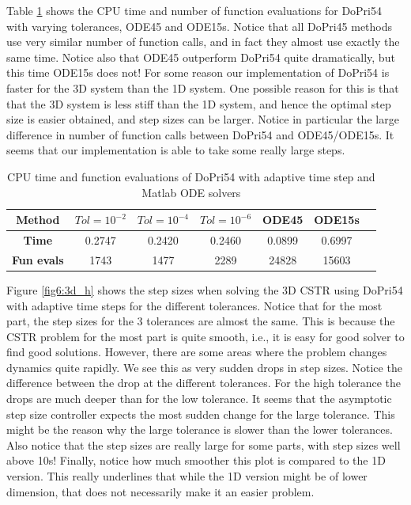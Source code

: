 Table \ref{tab6:3d_cstr} shows the CPU time and number of function evaluations for DoPri54 with varying tolerances, ODE45 and ODE15s. Notice that all DoPri45 methods use very similar number of function calls, and in fact they almost use exactly the same time. Notice also that ODE45 outperform DoPri54 quite dramatically, but this time ODE15s does not! For some reason our implementation of DoPri54 is faster for the 3D system than the 1D system. One possible reason for this is that that the 3D system is less stiff than the 1D system, and hence the optimal step size is easier obtained, and step sizes can be larger. Notice in particular the large difference in number of function calls between DoPri54 and ODE45/ODE15s. It seems that our implementation is able to take some really large steps.

\begin{table}[H]
    \centering
    \caption{CPU time and function evaluations of DoPri54 with adaptive time step and Matlab ODE solvers}
    \begin{tabular}{|c||c|c|c|c|c|c|} \hline
         \textbf{Method}    & $Tol = 10^{-2}$&   $Tol = 10^{-4}$ & $Tol = 10^{-6}$ & ODE45 & ODE15s     \\ \hline \hline 
         \textbf{Time}      & 0.2747 &   0.2420  &   0.2460 & 0.0899 & 0.6997   \\ \hline
         \textbf{Fun evals} &  1743     &   1477    &    2289   &  24828 & 15603  \\ \hline
    \end{tabular}
    \label{tab6:3d_cstr}
\end{table}

Figure \ref{fig6:3d_h} shows the step sizes when solving the 3D CSTR using DoPri54 with adaptive time steps for the different tolerances. Notice that for the most part, the step sizes for the 3 tolerances are almost the same. This is because the CSTR problem for the most part is quite smooth, i.e., it is easy for good solver to find good solutions. However, there are some areas where the problem changes dynamics quite rapidly. We see this as very sudden drops in step sizes. Notice the difference between the drop at the different tolerances. For the high tolerance the drops are much deeper than for the low tolerance. It seems that the asymptotic step size controller expects the most sudden change for the large tolerance. This might be the reason why the large tolerance is slower than the lower tolerances. Also notice that the step sizes are really large for some parts, with step sizes well above 10s! Finally, notice how much smoother this plot is compared to the 1D version. This really underlines that while the 1D version might be of lower dimension, that does not necessarily make it an easier problem. 


